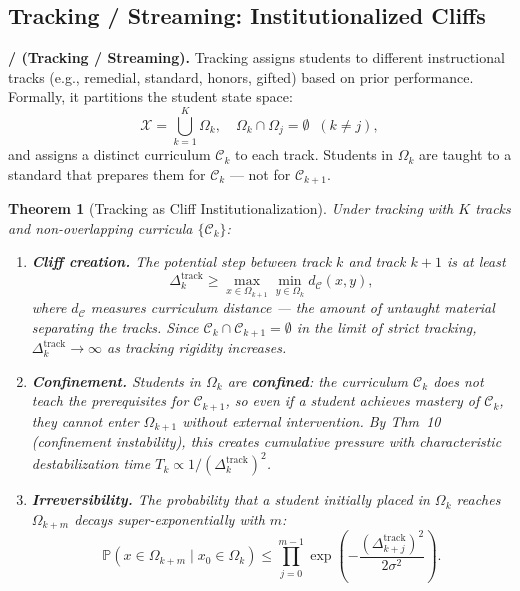 \documentclass[11pt,a4paper]{article}
\newtheorem{theorem}{Theorem}[section]
\newcommand{\Pbb}{\mathbb{P}}
\begin{document}
\subsection{Tracking / Streaming: Institutionalized Cliffs}
\textbf{/ (Tracking / Streaming).} Tracking assigns students to different instructional tracks (e.g., remedial, standard, honors, gifted) based on prior performance. Formally, it partitions the student state space:
\begin{equation}
    \mathcal{X} = \bigcup_{k=1}^{K} \Omega_k, \quad \Omega_k \cap \Omega_j = \emptyset \;\; (k \neq j),
\end{equation}
and assigns a distinct curriculum $\mathcal{C}_k$ to each track. Students in $\Omega_k$ are taught to a standard that prepares them for $\mathcal{C}_k$ — not for $\mathcal{C}_{k+1}$.
\begin{theorem}[Tracking as Cliff Institutionalization]
\label{thm:tracking}
Under tracking with $K$ tracks and non-overlapping curricula $\{\mathcal{C}_k\}$:
\begin{enumerate}[label=(\roman*)]
    \item \textbf{Cliff creation.} The potential step between track $k$ and track $k+1$ is at least
    \begin{equation}
        \Delta_k^{\text{track}} \geq \max_{x \in \Omega_{k+1}} \min_{y \in \Omega_k} d_{\mathcal{C}}(x,y),
    \end{equation}
    where $d_{\mathcal{C}}$ measures curriculum distance — the amount of untaught material separating the tracks. Since $\mathcal{C}_k \cap \mathcal{C}_{k+1} = \emptyset$ in the limit of strict tracking, $\Delta_k^{\text{track}} \to \infty$ as tracking rigidity increases.
    \item \textbf{Confinement.} Students in $\Omega_k$ are \textbf{confined}: the curriculum $\mathcal{C}_k$ does not teach the prerequisites for $\mathcal{C}_{k+1}$, so even if a student achieves mastery of $\mathcal{C}_k$, they cannot enter $\Omega_{k+1}$ without external intervention. By Thm~10 (confinement instability), this creates cumulative pressure with characteristic destabilization time $T_k \propto 1/(\Delta_k^{\text{track}})^2$.
    \item \textbf{Irreversibility.} The probability that a student initially placed in $\Omega_k$ reaches $\Omega_{k+m}$ decays super-exponentially with $m$:
    \begin{equation}
        \Pbb(x \in \Omega_{k+m} \mid x_0 \in \Omega_k) \leq \prod_{j=0}^{m-1} \exp\left(-\frac{(\Delta_{k+j}^{\text{track}})^2}{2\sigma^2}\right).
    \end{equation}
\end{enumerate}
\end{theorem}
\end{document}
